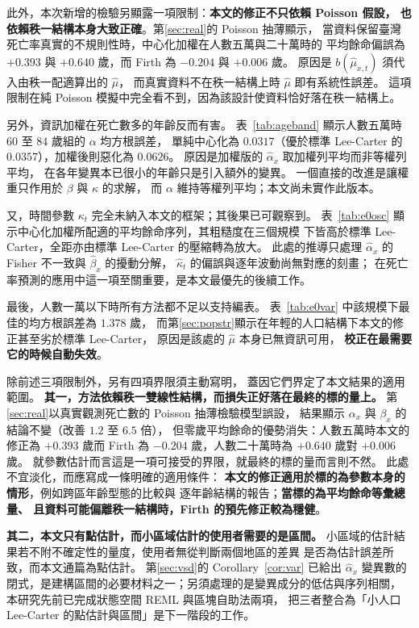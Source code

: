 \documentclass[UTF8, fontset=macnew, a4paper, 12pt]{ctexart}
\begin{document}
此外，本次新增的檢驗另顯露一項限制：\textbf{本文的修正不只依賴 Poisson 假設，
也依賴秩一結構本身大致正確}。第\ref{sec:real}的 Poisson 抽薄顯示，
當資料保留臺灣死亡率真實的不規則性時，中心化加權在人數五萬與二十萬時的
平均餘命偏誤為 $+0.393$ 與 $+0.640$ 歲，而 Firth 為 $-0.204$ 與 $+0.006$ 歲。
原因是 $b(\hat\mu_{x,t})$ 須代入由秩一配適算出的 $\hat\mu$，
而真實資料不在秩一結構上時 $\hat\mu$ 即有系統性誤差。
這項限制在純 Poisson 模擬中完全看不到，因為該設計使資料恰好落在秩一結構上。

另外，資訊加權在死亡數多的年齡反而有害。
表~\ref{tab:ageband} 顯示人數五萬時 $60$ 至 $84$ 歲組的 $\alpha$ 均方根誤差，
單純中心化為 $0.0317$（優於標準 Lee-Carter 的 $0.0357$），加權後則惡化為 $0.0626$。
原因是加權版的 $\hat\alpha_x$ 取加權列平均而非等權列平均，
在各年變異本已很小的年齡只是引入額外的變異。
一個直接的改進是讓權重只作用於 $\beta$ 與 $\kappa$ 的求解，
而 $\alpha$ 維持等權列平均；本文尚未實作此版本。

又，時間參數 $\kappa_t$ 完全未納入本文的框架；其後果已可觀察到。
表~\ref{tab:e0osc} 顯示中心化加權所配適的平均餘命序列，其粗糙度在三個規模
下皆高於標準 Lee-Carter，全距亦由標準 Lee-Carter 的壓縮轉為放大。
此處的推導只處理 $\hat\alpha_x$ 的 Fisher 不一致與 $\hat\beta_x$ 的擾動分解，
$\hat\kappa_t$ 的偏誤與逐年波動尚無對應的刻畫；
在死亡率預測的應用中這一項至關重要，是本文最優先的後續工作。

最後，人數一萬以下時所有方法都不足以支持編表。
表~\ref{tab:e0var} 中該規模下最佳的均方根誤差為 $1.378$ 歲，
而第\ref{sec:popstr}顯示在年輕的人口結構下本文的修正甚至劣於標準 Lee-Carter，
原因是該處的 $\hat\mu$ 本身已無資訊可用，
\textbf{校正在最需要它的時候自動失效}。



除前述三項限制外，另有四項界限須主動寫明，
蓋因它們界定了本文結果的適用範圍。
\textbf{其一，方法依賴秩一雙線性結構，而損失正好落在最終的標的量上。}
第\ref{sec:real}以真實觀測死亡數的 Poisson 抽薄檢驗模型誤設，
結果顯示 $\alpha_x$ 與 $\beta_x$ 的結論不變（改善 $1.2$ 至 $6.5$ 倍），
但零歲平均餘命的優勢消失：人數五萬時本文的修正為 $+0.393$ 歲而
Firth 為 $-0.204$ 歲，人數二十萬時為 $+0.640$ 歲對 $+0.006$ 歲。
就參數估計而言這是一項可接受的界限，就最終的標的量而言則不然。
此處不宜淡化，而應寫成一條明確的適用條件：
\textbf{本文的修正適用於標的為參數本身的情形}，例如跨區年齡型態的比較與
逐年齡結構的報告；\textbf{當標的為平均餘命等彙總量、
且資料可能偏離秩一結構時，Firth 的預先修正較為穩健}。

\textbf{其二，本文只有點估計，而小區域估計的使用者需要的是區間。}
小區域的估計結果若不附不確定性的量度，使用者無從判斷兩個地區的差異
是否為估計誤差所致，而本文通篇為點估計。
第\ref{sec:vsd}的 Corollary~\ref{cor:var} 已給出 $\hat\alpha_x$ 變異數的
閉式，是建構區間的必要材料之一；另須處理的是變異成分的低估與序列相關，
本研究先前已完成狀態空間 REML 與區塊自助法兩項，
把三者整合為「小人口 Lee-Carter 的點估計與區間」是下一階段的工作。
\end{document}
